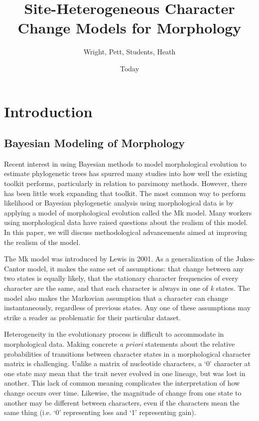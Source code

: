 \documentclass[]{article}
\begin{document}
\title{Site-Heterogeneous Character Change Models for Morphology}
\author{Wright, Pett, Students, Heath}
\date{Today}
\maketitle

\section{Introduction}
\subsection{Bayesian Modeling of Morphology}
	Recent interest in using Bayesian methods to model morphological evolution to estimate phylogenetic trees has spurred many studies into how well the existing toolkit performs, particularly in relation to parsimony methods.
	However, there has been little work expanding that toolkit. 
	The most common way to perform likelihood or Bayesian phylogenetic analysis using morphological data is by applying a model of morphological evolution called the Mk model.
	Many workers using morphological data have raised questions about the realism of this model.
	In this paper, we will discuss methodological advancements aimed at improving the realism of the model. \par
	The Mk model was introduced by Lewis in 2001.
	As a generalization of the Jukes-Cantor model, it makes the same set of assumptions: that change between any two states is equally likely, that the stationary character frequencies of every character are the same, and that each character is always in one of \textit{k} states.
	The model also makes the Markovian assumption that a character can change instantaneously, regardless of previous states. 
	Any one of these assumptions may strike a reader as problematic for their particular dataset. \par
	Heterogeneity in the evolutionary process is difficult to accommodate in morphological data. 
	Making concrete \textit{a priori} statements about the relative probabilities of transitions between character states in a morphological character matrix is challenging. 
	Unlike a matrix of nucleotide characters, a `0' character at one state may mean that the trait never evolved in one lineage, but was lost in another.
	This lack of common meaning complicates the interpretation of how change occurs over time.
	Likewise, the magnitude of change from one state to another may be different between characters, even if the characters mean the same thing (i.e. `0' representing loss and `1' representing gain).
\end{document}
